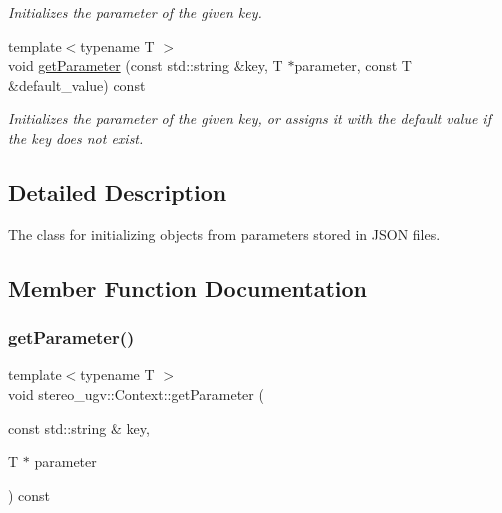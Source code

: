 \begin{DoxyCompactItemize}
\begin{DoxyCompactList}\small\item\em Initializes the parameter of the given key. \end{DoxyCompactList}\item 
{\footnotesize template$<$typename T $>$ }\\void \hyperlink{classstereo__ugv_1_1Context_a8e7e25d1efa5c92a84830824c0effa27}{get\+Parameter} (const std\+::string \&key, T $\ast$parameter, const T \&default\+\_\+value) const
\begin{DoxyCompactList}\small\item\em Initializes the parameter of the given key, or assigns it with the default value if the key does not exist. \end{DoxyCompactList}\end{DoxyCompactItemize}


\subsection{Detailed Description}
The class for initializing objects from parameters stored in J\+S\+ON files. 

\subsection{Member Function Documentation}
\mbox{\label{classstereo__ugv_1_1Context_a1996f3d3213ab26a3ba84a1c0cf7b62e}} 
\subsubsection{\texorpdfstring{get\+Parameter()}{getParameter()}\hspace{0.1cm}{\footnotesize\ttfamily [1/2]}}
{\footnotesize\ttfamily template$<$typename T $>$ \\
void stereo\+\_\+ugv\+::\+Context\+::get\+Parameter (\begin{DoxyParamCaption}\item[{const std\+::string \&}]{key,  }\item[{T $\ast$}]{parameter }\end{DoxyParamCaption}) const\hspace{0.3cm}{\ttfamily [inline]}}



